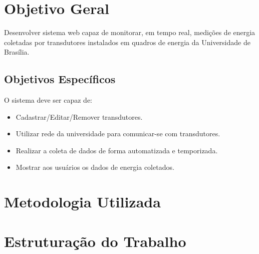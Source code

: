 \section{Objetivo Geral}
Desenvolver sistema web capaz de monitorar, em tempo real, medições de energia coletadas por transdutores
instalados em quadros de energia da Universidade de Brasília.

\subsection{Objetivos Específicos}
O sistema deve ser capaz de:
\begin{itemize}
    \item Cadastrar/Editar/Remover transdutores.
    \item Utilizar rede da universidade para comunicar-se com transdutores.
    \item Realizar a coleta de dados de forma automatizada e temporizada.
    \item Mostrar aos usuários os dados de energia coletados.
\end{itemize}

\section{Metodologia Utilizada}

\section{Estruturação do Trabalho}
